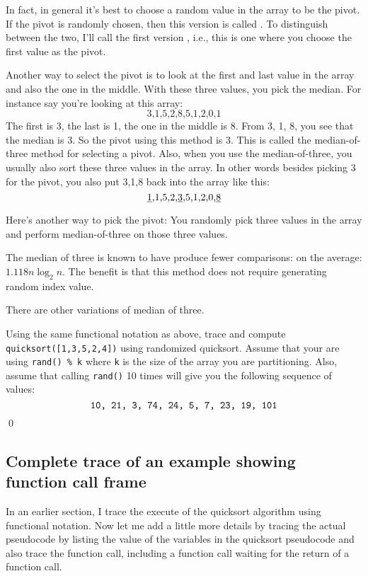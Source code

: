 In fact, in general
it's best to choose a random value in the array to be the pivot.
If the pivot is randomly chosen, then this version
is called .
To distinguish between the two, I'll call the first version
, i.e., this is one
where you choose the first value as the pivot.

Another way to select the pivot is to look at the first and last value in the
array and also the one in the middle.
With these three values, you pick the median.
For instance say you're looking at this array:
\[
\text{3,1,5,2,8,5,1,2,0,1}
\]
The first is 3, the last is 1, the one in the middle is 8.
From 3, 1, 8, you see that the median is 3.
So the pivot using this method is 3.
This is called the median-of-three method for selecting a pivot.
Also, when you use the median-of-three, you usually also sort these three
values in the array.
In other words besides picking 3 for the pivot,
you also put 3,1,8 back into the array like this:
\[
\text{\underline{1},1,5,2,\underline{3},5,1,2,0,\underline{8}}
\]

Here's another way to pick the pivot:
You randomly pick three values in the array and perform median-of-three
on those three values.

The median of three is known to have produce fewer comparisons:
on the average: $1.118 n \log_2 n$.
The benefit is that this method does not require generating random
index value.

There are other variations of
median of three.




\newpage
\begin{ex}
Using the same functional notation as above, trace and compute
\texttt{quicksort([1,3,5,2,4])} using randomized quicksort.
Assume that your are using \verb!rand() % k!
where \verb!k! is the size of the array you are partitioning.
Also, assume that calling \verb!rand()! 10 times will give you the following
sequence of values:
\[
\text{\texttt{10, 21, 3, 74, 24, 5, 7, 23, 19, 101}}
\]
\qed
\end{ex}


\newpage
\subsection{Complete trace of an example showing function call frame}

In an earlier section, I trace the execute of the 
quicksort algorithm using functional notation.
Now let me add a little more details by tracing the 
actual pseudocode by listing the value of the variables in the 
quicksort pseudocode and also trace the 
function call, including a function call waiting for 
the return of a function call.

